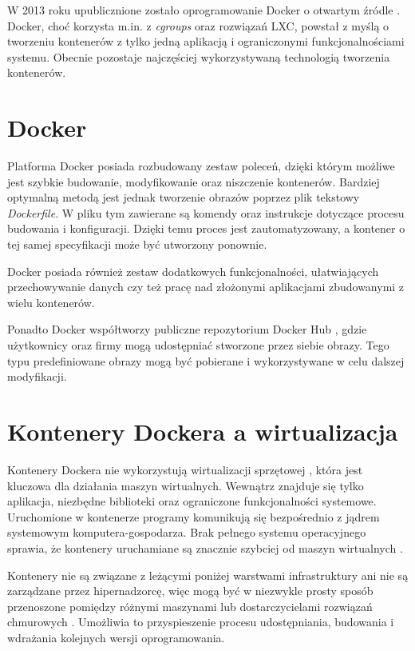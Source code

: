 W 2013 roku upublicznione zostało oprogramowanie Docker o otwartym źródle \cite{docker}. Docker, choć korzysta m.in. z \textit{cgroups} oraz rozwiązań LXC, powstał z myślą o tworzeniu kontenerów z tylko jedną aplikacją i ograniczonymi funkcjonalnościami systemu. Obecnie pozostaje najczęściej wykorzystywaną technologią tworzenia kontenerów.

\section{Docker}

Platforma Docker posiada rozbudowany zestaw poleceń, dzięki którym możliwe jest szybkie budowanie, modyfikowanie oraz niszczenie kontenerów. Bardziej optymalną metodą jest jednak tworzenie obrazów poprzez plik tekstowy \textit{Dockerfile}. W pliku tym zawierane są komendy oraz instrukcje dotyczące procesu budowania i konfiguracji. Dzięki temu proces jest zautomatyzowany, a kontener o tej samej specyfikacji może być utworzony ponownie. 

Docker posiada również zestaw dodatkowych funkcjonalności, ułatwiających przechowywanie danych czy też pracę nad złożonymi aplikacjami zbudowanymi z wielu kontenerów. 

Ponadto Docker współtworzy publiczne repozytorium Docker Hub \cite{dockerhub}, gdzie użytkownicy oraz firmy mogą udostępniać stworzone przez siebie obrazy. Tego typu predefiniowane obrazy mogą być pobierane i wykorzystywane w celu dalszej modyfikacji.

\section{Kontenery Dockera a wirtualizacja}

Kontenery Dockera nie wykorzystują wirtualizacji sprzętowej \cite{nickoloff}, która jest kluczowa dla działania maszyn wirtualnych. Wewnątrz znajduje się tylko aplikacja, niezbędne biblioteki oraz ograniczone funkcjonalności systemowe. Uruchomione w kontenerze programy komunikują się bezpośrednio z jądrem systemowym komputera-gospodarza. Brak pełnego systemu operacyjnego sprawia, że kontenery uruchamiane są znacznie szybciej od maszyn wirtualnych \cite{krochmalski}.
 
Kontenery nie są związane z leżącymi poniżej warstwami infrastruktury ani nie są zarządzane przez hipernadzorcę, więc mogą być w niezwykle prosty sposób przenoszone pomiędzy różnymi maszynami lub dostarczycielami rozwiązań chmurowych \cite{poulton}. Umożliwia to przyspieszenie procesu udostępniania, budowania i wdrażania kolejnych wersji oprogramowania.

